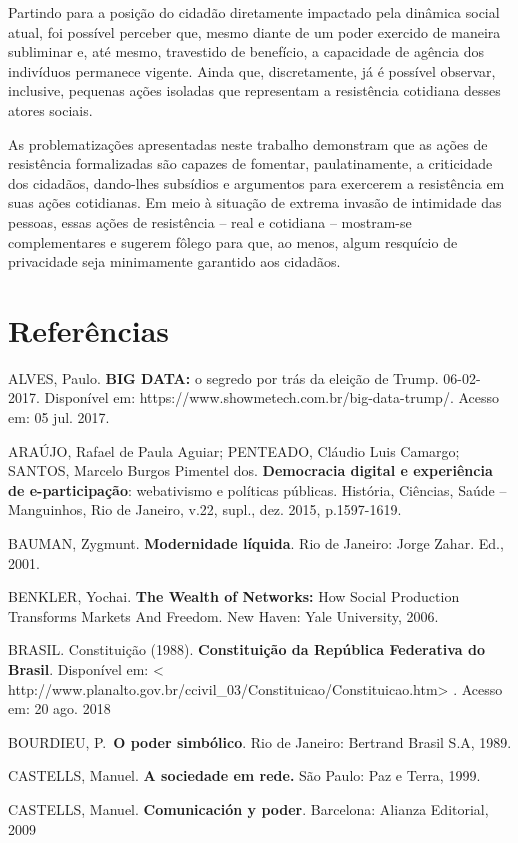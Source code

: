 Partindo para a posição do cidadão diretamente impactado pela dinâmica
social atual, foi possível perceber que, mesmo diante de um poder
exercido de maneira subliminar e, até mesmo, travestido de benefício, a
capacidade de agência dos indivíduos permanece vigente. Ainda que,
discretamente, já é possível observar, inclusive, pequenas ações
isoladas que representam a resistência cotidiana desses atores sociais.

As problematizações apresentadas neste trabalho demonstram que as ações
de resistência formalizadas são capazes de fomentar, paulatinamente, a
criticidade dos cidadãos, dando-lhes subsídios e argumentos para
exercerem a resistência em suas ações cotidianas. Em meio à situação de
extrema invasão de intimidade das pessoas, essas ações de resistência --
real e cotidiana -- mostram-se complementares e sugerem fôlego para que,
ao menos, algum resquício de privacidade seja minimamente garantido aos
cidadãos.

\section{Referências}

ALVES, Paulo. \textbf{BIG DATA:} o segredo por trás da eleição de Trump.
06-02-2017. Disponível em:
https://www.showmetech.com.br/big-data-trump/. Acesso em: 05 jul. 2017.

ARAÚJO, Rafael de Paula Aguiar; PENTEADO, Cláudio Luis Camargo; SANTOS,
Marcelo Burgos Pimentel dos. \textbf{Democracia digital e experiência de
e-participação}: webativismo e políticas públicas. História, Ciências,
Saúde -- Manguinhos, Rio de Janeiro, v.22, supl., dez. 2015,
p.1597-1619.

BAUMAN, Zygmunt. \textbf{Modernidade líquida}. Rio de Janeiro: Jorge
Zahar. Ed., 2001.

BENKLER, Yochai. \textbf{The Wealth of Networks:} How Social Production
Transforms Markets And Freedom. New Haven: Yale University, 2006.

BRASIL. Constituição (1988). \textbf{Constituição da República
Federativa do Brasil}. Disponível em: \textless{}
http://www.planalto.gov.br/ccivil\_03/Constituicao/Constituicao.htm\textgreater{}
. Acesso em: 20 ago. 2018

BOURDIEU, P.~\textbf{O poder simbólico}. Rio de Janeiro: Bertrand Brasil
S.A, 1989.

CASTELLS, Manuel. \textbf{A sociedade em rede.} São Paulo: Paz e Terra,
1999.

CASTELLS, Manuel. \textbf{Comunicación y poder}. Barcelona: Alianza
Editorial, 2009

